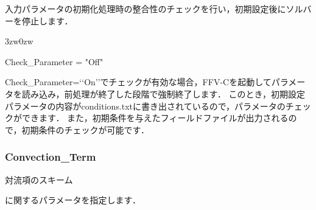 入力パラメータの初期化処理時の\hypertarget{tgt:check_parameter}{整合性のチェック}を行い，初期設定後にソルバーを停止します．

\begin{indentation}{3zw}{0zw}

{\small
\begin{program}
  Check_Parameter = "Off"
\end{program}
}

Check\_Parameter=\lq\lq On\rq\rq でチェックが有効な場合，FFV-Cを起動してパラメータを読み込み，前処理が終了した段階で強制終了します．
このとき，初期設定パラメータの内容がconditions.txtに書き出されているので，パラメータのチェックができます．
また，初期条件を与えたフィールドファイルが出力されるので，初期条件のチェックが可能です．

\end{indentation}



\pagebreak
\subsubsection{Convection\_Term}

\hypertarget{tgt:convection_term}{対流項のスキーム}に関するパラメータを指定します．

